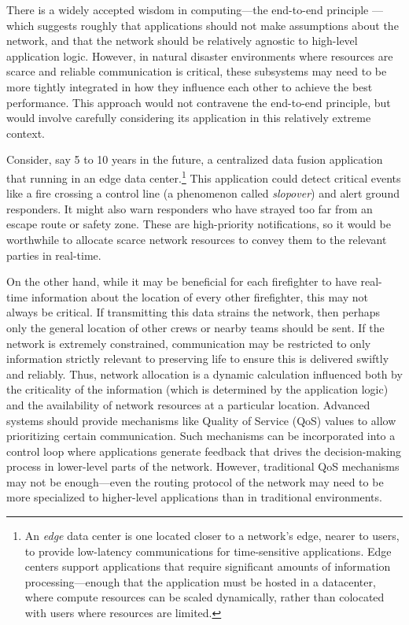 \documentclass[]             %
{NASA}                       %
\theoremstyle{definition}
\begin{document}
There is a widely accepted wisdom in computing---the end-to-end
principle \cite{1984:end-to-end}---which suggests roughly that
applications should not make assumptions about the network, and that
the network should be relatively agnostic to high-level application
logic. However, in natural disaster environments where resources are
scarce and reliable communication is critical, these subsystems may
need to be more tightly integrated in how they influence each other to
achieve the best performance. This approach would not contravene the
end-to-end principle, but would involve carefully considering its
application in this relatively extreme context.

Consider, say 5 to 10 years in the future, a centralized data fusion
application that running in an edge data center.\footnote{An
  \emph{edge} data center is one located closer to a network's edge,
  nearer to users, to provide low-latency communications for
  time-sensitive applications. Edge centers support applications that
  require significant amounts of information processing---enough that
  the application must be hosted in a datacenter, where compute
  resources can be scaled dynamically, rather than colocated with
  users where resources are limited.} This application could detect
critical events like a fire crossing a control line (a phenomenon
called \emph{slopover}) and alert ground responders. It might also
warn responders who have strayed too far from an escape route or
safety zone. These are high-priority notifications, so it would be
worthwhile to allocate scarce network resources to convey them to the
relevant parties in real-time.

On the other hand, while it may be beneficial for each firefighter to
have real-time information about the location of every other
firefighter, this may not always be critical. If transmitting this
data strains the network, then perhaps only the general location of
other crews or nearby teams should be sent. If the network is
extremely constrained, communication may be restricted to only
information strictly relevant to preserving life to ensure this is
delivered swiftly and reliably. Thus, network allocation is a dynamic
calculation influenced both by the criticality of the information
(which is determined by the application logic) and the availability of
network resources at a particular location. Advanced systems should
provide mechanisms like Quality of Service (QoS) values to allow
prioritizing certain communication. Such mechanisms can be
incorporated into a control loop where applications generate feedback
that drives the decision-making process in lower-level parts of the
network. However, traditional QoS mechanisms may not be enough---even
the routing protocol of the network may need to be more specialized to
higher-level applications than in traditional environments.
\end{document}
